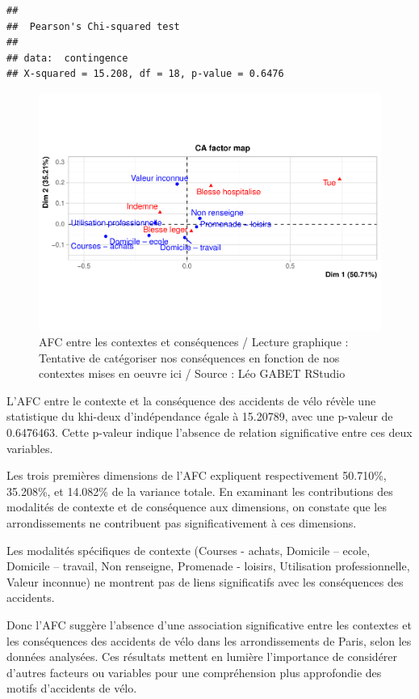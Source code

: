 \documentclass[french,]{compterendu}
\theoremstyle{urcastyle}
\theoremstyle{remark}
\begin{document}
\begin{verbatim}
## 
##  Pearson's Chi-squared test
## 
## data:  contingence
## X-squared = 15.208, df = 18, p-value = 0.6476
\end{verbatim}

\begin{figure}[H]

{\centering \includegraphics[width=0.9\linewidth]{Rapport_ADD_LEO-GABET_files/figure-latex/Afc3PARIS-1} 

}

\caption{AFC entre les contextes et conséquences / Lecture graphique : Tentative de catégoriser nos conséquences en fonction de nos contextes mises en oeuvre ici / Source : Léo GABET RStudio}\label{fig:Afc3PARIS}
\end{figure}

L'AFC entre le contexte et la conséquence des accidents de vélo révèle une statistique du khi-deux d'indépendance égale à 15.20789, avec une p-valeur de 0.6476463. Cette p-valeur indique l'absence de relation significative entre ces deux variables.

Les trois premières dimensions de l'AFC expliquent respectivement 50.710\%, 35.208\%, et 14.082\% de la variance totale. En examinant les contributions des modalités de contexte et de conséquence aux dimensions, on constate que les arrondissements ne contribuent pas significativement à ces dimensions.

Les modalités spécifiques de contexte (Courses - achats, Domicile -- ecole, Domicile -- travail, Non renseigne, Promenade - loisirs, Utilisation professionnelle, Valeur inconnue) ne montrent pas de liens significatifs avec les conséquences des accidents.

Donc l'AFC suggère l'absence d'une association significative entre les contextes et les conséquences des accidents de vélo dans les arrondissements de Paris, selon les données analysées. Ces résultats mettent en lumière l'importance de considérer d'autres facteurs ou variables pour une compréhension plus approfondie des motifs d'accidents de vélo.
\end{document}
